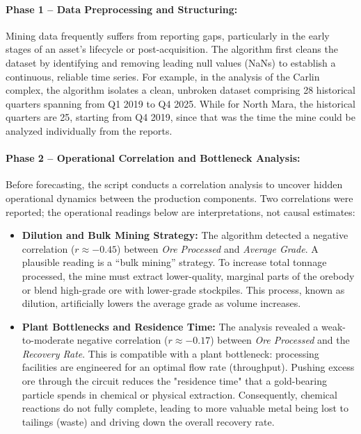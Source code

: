 \paragraph{Phase 1 -- Data Preprocessing and Structuring:}
Mining data frequently suffers from reporting gaps, particularly in the early stages of an asset's lifecycle or post-acquisition. The algorithm first cleans the dataset by identifying and removing leading null values (NaNs) to establish a continuous, reliable time series. For example, in the analysis of the Carlin complex, the algorithm isolates a clean, unbroken dataset comprising 28 historical quarters spanning from Q1 2019 to Q4 2025. While for North Mara, the historical quarters are 25, starting from Q4 2019, since that was the time the mine could be analyzed individually from the reports.

\paragraph{Phase 2 -- Operational Correlation and Bottleneck Analysis:}
Before forecasting, the script conducts a correlation analysis to uncover hidden operational dynamics between the production components. Two correlations were reported; the operational readings below are interpretations, not causal estimates:

\begin{itemize}
    \item \textbf{Dilution and Bulk Mining Strategy:} The algorithm detected a negative correlation ($ r\approx -0.45$) between \textit{Ore Processed} and \textit{Average Grade}. A plausible reading is a ``bulk mining'' strategy. To increase total tonnage processed, the mine must extract lower-quality, marginal parts of the orebody or blend high-grade ore with lower-grade stockpiles. This process, known as dilution, artificially lowers the average grade as volume increases.
    
    \item \textbf{Plant Bottlenecks and Residence Time:} The analysis revealed a weak-to-moderate negative correlation ($r \approx -0.17$) between \textit{Ore Processed} and the \textit{Recovery Rate}. This is compatible with a plant bottleneck: processing facilities are engineered for an optimal flow rate (throughput). Pushing excess ore through the circuit reduces the "residence time" that a gold-bearing particle spends in chemical or physical extraction. Consequently, chemical reactions do not fully complete, leading to more valuable metal being lost to tailings (waste) and driving down the overall recovery rate.
\end{itemize}


